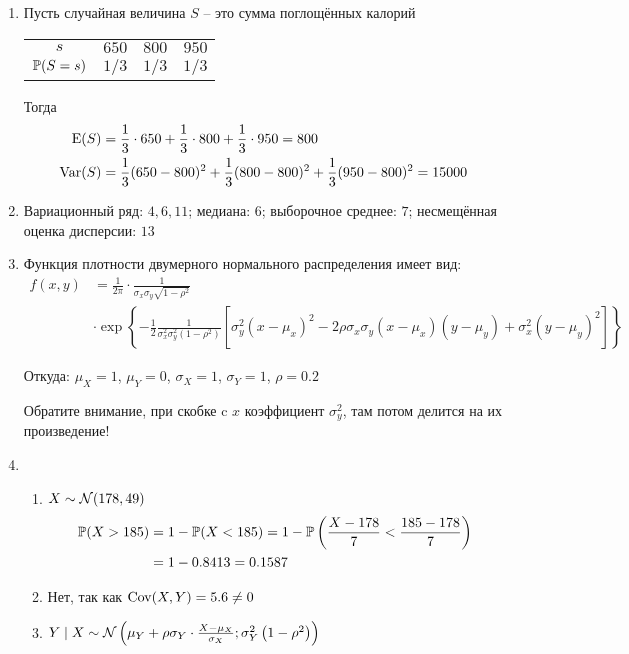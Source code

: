 \begin{enumerate}
\item Пусть случайная величина $S$ – это сумма поглощённых калорий

\begin{center}
\begin{tabular}{cccc}
\toprule
$s$ & $650$ & $800$ & $950$ \\
$\P(S = s)$ & $1/3$ & $1/3$ & $1/3$ \\ \bottomrule
\end{tabular}
\end{center}

Тогда
\begin{align*}
\E(S) &= \frac{1}{3}\cdot 650 +  \frac{1}{3}\cdot 800 +  \frac{1}{3}\cdot 950 = 800 \\
\Var(S) &= \frac{1}{3}(650-800)^2 + \frac{1}{3}(800-800)^2 + \frac{1}{3}(950-800)^2 = 15000
\end{align*}
\item Вариационный ряд: $4, 6, 11$; медиана: $6$; выборочное среднее: $7$;
несмещённая оценка дисперсии: $13$
\item Функция плотности двумерного нормального распределения имеет вид:
\begin{align*}
f(x,y) &= \frac{1}{2\pi}\cdot \frac{1}{\sigma_x \sigma_y \sqrt{1-\rho^2}} \\
&\cdot
\exp\left\{{-\frac{1}{2}\frac{1}{\sigma_x^2 \sigma_y^2\left(1-\rho^2\right)}\left[\sigma_y^2(x-\mu_x)^2-2\rho\sigma_x\sigma_y(x-\mu_x)(y-\mu_y)+\sigma_x^2(y-\mu_y)^2\right]}\right\}
\end{align*}

Откуда: $\mu_X=1$, $\mu_Y=0$, $\sigma_X = 1$, $\sigma_Y = 1$, $\rho = 0.2$

Обратите внимание, при скобке c $x$ коэффициент $\sigma^2_y$, там потом делится на их произведение!

\item
\begin{enumerate}
\item $X \sim \cN(178, 49)$
\begin{align*}
\P(X>185) &= 1  - \P(X<185) = 1- \P\left(\frac{X-178}{7} < \frac{185-178}{7}\right) \\
&= 1 - 0.8413 = 0.1587
\end{align*}
\item Нет, так как $\Cov(X, Y) = 5.6 \neq 0$
\item $Y \mid X \sim \cN\left(\mu_Y + \rho\sigma_Y\cdot\frac{X-\mu_X}{\sigma_X}; \sigma_Y^2\left(1-\rho^2\right)\right)$


\end{enumerate}
\end{enumerate}
